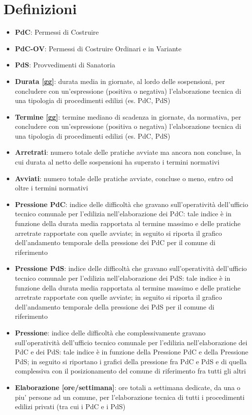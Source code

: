 \documentclass[a4paper]{article}
\begin{document}
	\section{Definizioni}
	\begin{itemize}
		\item \textbf{PdC}: Permessi di Costruire
		\item \textbf{PdC-OV}: Permessi di Costruire Ordinari e in Variante
		\item \textbf{PdS}: Provvedimenti di Sanatoria
		\item \textbf{Durata [gg]}: durata media in giornate, al lordo delle sospensioni, per concludere con un'espressione (positiva o negativa) l'elaborazione tecnica di una tipologia di procedimenti edilizi (es. PdC, PdS)
		\item \textbf{Termine [gg]}: termine mediano di scadenza in giornate, da normativa, per concludere con un'espressione (positiva o negativa) l'elaborazione tecnica di una tipologia di procedimenti edilizi (es. PdC, PdS)
		\item \textbf{Arretrati}: numero totale delle pratiche avviate ma ancora non concluse, la cui durata al netto delle sospensioni ha superato i termini normativi
		\item \textbf{Avviati}: numero totale delle pratiche avviate, concluse o meno, entro od oltre i termini normativi
		\item \textbf{Pressione PdC}: indice delle difficoltà che gravano sull'operatività dell'ufficio tecnico comunale per l'edilizia nell'elaborazione dei PdC: tale indice è in funzione della durata media rapportata al termine massimo e delle pratiche arretrate rapportate con quelle avviate; in seguito si riporta il grafico dell'andamento temporale della pressione dei PdC per il comune di riferimento
		\item \textbf{Pressione PdS}: indice delle difficoltà che gravano sull'operatività dell'ufficio tecnico comunale per l'edilizia nell'elaborazione dei PdS: tale indice è in funzione della durata media rapportata al termine massimo e delle pratiche arretrate rapportate con quelle avviate; in seguito si riporta il grafico dell'andamento temporale della pressione dei PdS per il comune di riferimento
		\item \textbf{Pressione}: indice delle difficoltà che complessivamente gravano sull'operatività dell'ufficio tecnico comunale per l'edilizia nell'elaborazione dei PdC e dei PdS: tale indice è in funzione della Pressione PdC e della Pressione PdS; in seguito si riportano i grafici della pressione fra PdC e PdS e di quella complessiva con il posizionamento del comune di riferimento fra tutti gli altri
		\item \textbf{Elaborazione [ore/settimana]}: ore totali a settimana dedicate, da una o piu' persone ad un comune, per l'elaborazione tecnica di tutti i procedimenti edilizi privati (tra cui i PdC e i PdS)
	\end{itemize}
	\clearpage
\end{document}
